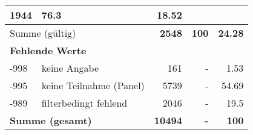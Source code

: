 \begin{longtable}{lXrrr}
       \num{1944} &
       \num[round-mode=places,round-precision=2]{76,3} &
         \num[round-mode=places,round-precision=2]{18,52} \\
     \midrule
     \multicolumn{2}{l}{Summe (gültig)} &
       \textbf{\num{2548}} &
     \textbf{100} &
       \textbf{\num[round-mode=places,round-precision=2]{24,28}} \\
     \multicolumn{5}{l}{\textbf{Fehlende Werte}}\\
       -998 &
       keine Angabe &
         \num{161} &
        - &
         \num[round-mode=places,round-precision=2]{1,53} \\
       -995 &
       keine Teilnahme (Panel) &
         \num{5739} &
        - &
         \num[round-mode=places,round-precision=2]{54,69} \\
       -989 &
       filterbedingt fehlend &
         \num{2046} &
        - &
         \num[round-mode=places,round-precision=2]{19,5} \\
     \midrule
     \multicolumn{2}{l}{\textbf{Summe (gesamt)}} &
          \textbf{\num{10494}} &
        \textbf{-} &
        \textbf{100} \\
     \bottomrule
     \end{longtable}
     
